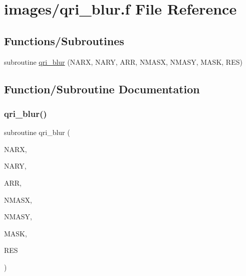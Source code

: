 \hypertarget{qri__blur_8f}{}\section{images/qri\+\_\+blur.f File Reference}
\label{qri__blur_8f}
\subsection*{Functions/\+Subroutines}
\begin{DoxyCompactItemize}
\item 
subroutine \hyperlink{qri__blur_8f_ac9efa9feed46a43b263757b4cc72947e}{qri\+\_\+blur} (N\+A\+RX, N\+A\+RY, A\+RR, N\+M\+A\+SX, N\+M\+A\+SY, M\+A\+SK, R\+ES)
\end{DoxyCompactItemize}


\subsection{Function/\+Subroutine Documentation}
\mbox{\label{qri__blur_8f_ac9efa9feed46a43b263757b4cc72947e}} 
\subsubsection{\texorpdfstring{qri\+\_\+blur()}{qri\_blur()}}
{\footnotesize\ttfamily subroutine qri\+\_\+blur (\begin{DoxyParamCaption}\item[{integer}]{N\+A\+RX,  }\item[{integer}]{N\+A\+RY,  }\item[{double precision, dimension(narx,nary)}]{A\+RR,  }\item[{integer}]{N\+M\+A\+SX,  }\item[{integer}]{N\+M\+A\+SY,  }\item[{double precision, dimension(nmasx,nmasy)}]{M\+A\+SK,  }\item[{double precision, dimension(narx,nary)}]{R\+ES }\end{DoxyParamCaption})}

